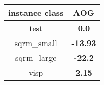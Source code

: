 \begin{tabular}{c|c}
instance class & AOG \\ 
\hline
test         & {\bf 0.0}    \\ 
sqrm\_small  & {\bf -13.93} \\ 
sqrm\_large  & {\bf -22.2}  \\ 
visp         & {\bf 2.15}   \\ 
\end{tabular}